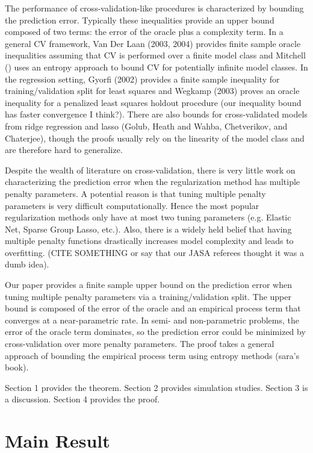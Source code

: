 \documentclass[12pt]{article}
\begin{document}
The performance of cross-validation-like procedures is characterized by bounding the prediction error. Typically these inequalities provide an upper bound composed of two terms: the error of the oracle plus a complexity term. In a general CV framework, Van Der Laan (2003, 2004) provides finite sample oracle inequalities assuming that CV is performed over a finite model class and Mitchell () uses an entropy approach to bound CV for potentially infinite model classes. In the regression setting, Gyorfi (2002) provides a finite sample inequality for training/validation split for least squares and Wegkamp (2003) proves an oracle inequality for a penalized least squares holdout procedure (our inequality bound has faster convergence I think?). There are also bounds for cross-validated models from ridge regression and lasso (Golub, Heath and Wahba, Chetverikov, and Chaterjee), though the proofs usually rely on the linearity of the model class and are therefore hard to generalize.

Despite the wealth of literature on cross-validation, there is very little work on characterizing the prediction error when the regularization method has multiple penalty parameters. A potential reason is that tuning multiple penalty parameters is very difficult computationally. Hence the most popular regularization methods only have at most two tuning parameters (e.g. Elastic Net, Sparse Group Lasso, etc.). Also, there is a widely held belief that having multiple penalty functions drastically increases model complexity and leads to overfitting. (CITE SOMETHING or say that our JASA referees thought it was a dumb idea).

Our paper provides a finite sample upper bound on the prediction error when tuning multiple penalty parameters via a training/validation split. The upper bound is composed of the error of the oracle and an empirical process term that converges at a near-parametric rate. In semi- and non-parametric problems, the error of the oracle term dominates, so the prediction error could be minimized by cross-validation over more penalty parameters. The proof takes a general approach of bounding the empirical process term using entropy methods (sara's book).

Section 1 provides the theorem. Section 2 provides simulation studies. Section 3 is a discussion. Section 4 provides the proof.

\section{Main Result} \label{main_results}
\end{document}
